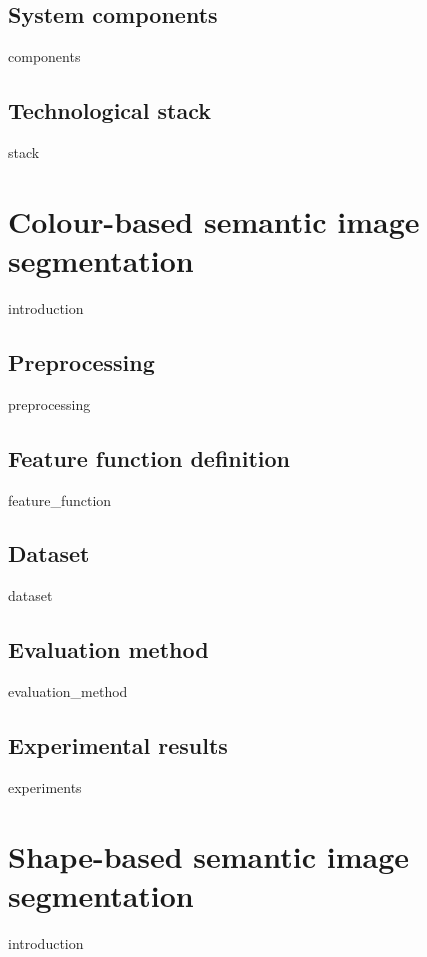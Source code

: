\documentclass[12pt]{report}
\begin{document}
    \section{System components}	
    {components}
    
    \section{Technological stack}	
    {stack}

\chapter{Colour-based semantic image segmentation}
    \label{chapter:linear}
    {introduction}
    
    \section{Preprocessing}
    \label{sec:linear_preprocessing}
    {preprocessing}
    
    \section{Feature function definition}	
    {feature_function}
    
    \section{Dataset}	
    \label{sec:linear_dataset}
    {dataset}
    
    \section{Evaluation method}	
    {evaluation_method}
    
    \section{Experimental results}	
    {experiments}
    



\chapter{Shape-based semantic image segmentation}
    \label{chapter:nonlinear}
    {introduction}
    
\end{document}
